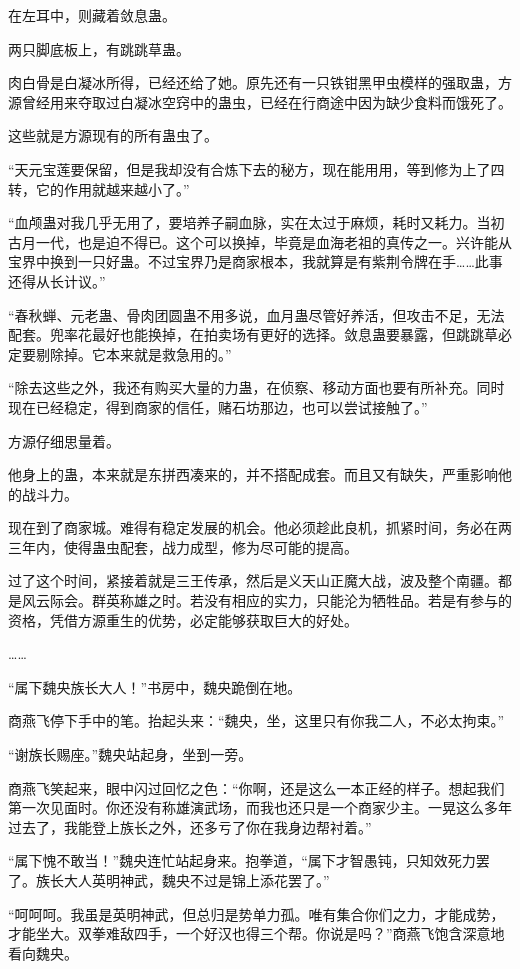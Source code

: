 \begin{this_body}
在左耳中，则藏着敛息蛊。

两只脚底板上，有跳跳草蛊。

肉白骨是白凝冰所得，已经还给了她。原先还有一只铁钳黑甲虫模样的强取蛊，方源曾经用来夺取过白凝冰空窍中的蛊虫，已经在行商途中因为缺少食料而饿死了。

这些就是方源现有的所有蛊虫了。

“天元宝莲要保留，但是我却没有合炼下去的秘方，现在能用用，等到修为上了四转，它的作用就越来越小了。”

“血颅蛊对我几乎无用了，要培养子嗣血脉，实在太过于麻烦，耗时又耗力。当初古月一代，也是迫不得已。这个可以换掉，毕竟是血海老祖的真传之一。兴许能从宝界中换到一只好蛊。不过宝界乃是商家根本，我就算是有紫荆令牌在手……此事还得从长计议。”

“春秋蝉、元老蛊、骨肉团圆蛊不用多说，血月蛊尽管好养活，但攻击不足，无法配套。兜率花最好也能换掉，在拍卖场有更好的选择。敛息蛊要暴露，但跳跳草必定要剔除掉。它本来就是救急用的。”

“除去这些之外，我还有购买大量的力蛊，在侦察、移动方面也要有所补充。同时现在已经稳定，得到商家的信任，赌石坊那边，也可以尝试接触了。”

方源仔细思量着。

他身上的蛊，本来就是东拼西凑来的，并不搭配成套。而且又有缺失，严重影响他的战斗力。

现在到了商家城。难得有稳定发展的机会。他必须趁此良机，抓紧时间，务必在两三年内，使得蛊虫配套，战力成型，修为尽可能的提高。

过了这个时间，紧接着就是三王传承，然后是义天山正魔大战，波及整个南疆。都是风云际会。群英称雄之时。若没有相应的实力，只能沦为牺牲品。若是有参与的资格，凭借方源重生的优势，必定能够获取巨大的好处。

……

“属下魏央族长大人！”书房中，魏央跪倒在地。

商燕飞停下手中的笔。抬起头来：“魏央，坐，这里只有你我二人，不必太拘束。”

“谢族长赐座。”魏央站起身，坐到一旁。

商燕飞笑起来，眼中闪过回忆之色：“你啊，还是这么一本正经的样子。想起我们第一次见面时。你还没有称雄演武场，而我也还只是一个商家少主。一晃这么多年过去了，我能登上族长之外，还多亏了你在我身边帮衬着。”

“属下愧不敢当！”魏央连忙站起身来。抱拳道，“属下才智愚钝，只知效死力罢了。族长大人英明神武，魏央不过是锦上添花罢了。”

“呵呵呵。我虽是英明神武，但总归是势单力孤。唯有集合你们之力，才能成势，才能坐大。双拳难敌四手，一个好汉也得三个帮。你说是吗？”商燕飞饱含深意地看向魏央。


\end{this_body}
